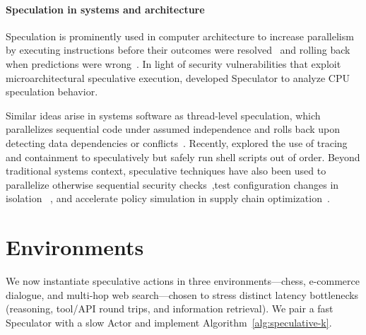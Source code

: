 \documentclass{article} %
\theoremstyle{plain} %
\theoremstyle{definition} %
\theoremstyle{remark} %
\begin{document}


\paragraph{Speculation in systems and architecture}
Speculation is prominently used in computer architecture to increase parallelism
by executing instructions before their outcomes were resolved~\citep{tomasulo1967efficient} and 
rolling back when predictions were wrong~\citep{lam1992limits}. In light of security vulnerabilities that exploit microarchitectural speculative execution, \citep{mambretti2019speculator} developed Speculator to analyze CPU speculation behavior. 

Similar ideas arise in systems software as thread-level speculation, which parallelizes sequential code under assumed independence and rolls back upon detecting data dependencies or conflicts~\citep{10.1145/2938369}. Recently, \citep{liargkovas2023shell} explored the use of tracing and containment to speculatively but safely run shell scripts out of order. Beyond traditional systems context, speculative techniques have also been used to parallelize otherwise sequential security checks~\citep{nightingale2008parallelizing},test configuration changes in isolation ~\citep{su2007autobash}, and accelerate policy simulation in supply chain optimization~\citep{farias2024speeding}.




\vspace{-10pt}
\section{Environments}
We now instantiate speculative actions in three environments---chess, e-commerce dialogue, and multi-hop web search---chosen 
to stress distinct latency bottlenecks (reasoning, tool/API round trips, and information retrieval).
We pair a fast Speculator with a slow Actor and implement Algorithm~\ref{alg:speculative-k}. 
\end{document}
